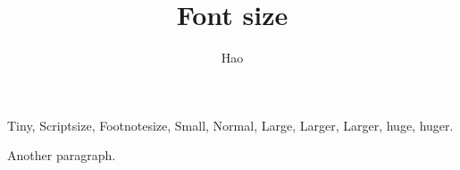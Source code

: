 \documentclass[a4paper,10pt]{article}
\title{Font size}
\author{Hao}
\begin{document}
\maketitle

\noindent
\tiny Tiny,
\scriptsize Scriptsize,
\footnotesize Footnotesize,
\small Small,
\normalsize Normal,
\large Large,
\Large Larger,
\LARGE Larger,
\huge huge,
\Huge huger.

Another paragraph.
\end{document}
